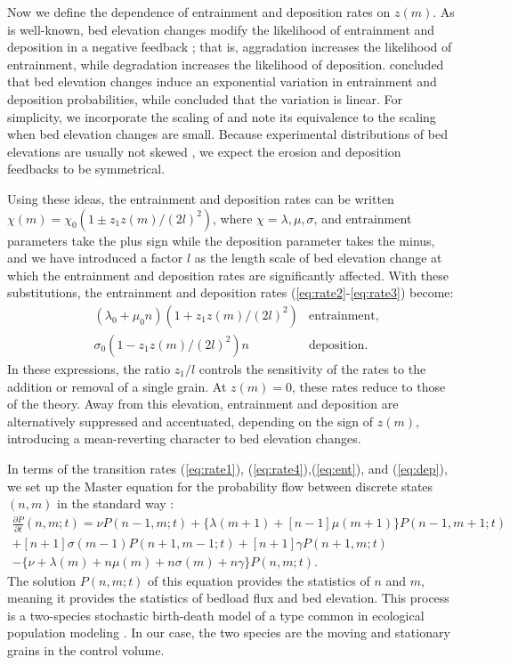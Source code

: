 \documentclass[draft]{agujournal2018}
\begin{document}
Now we define the dependence of entrainment and deposition rates on $z(m)$.
As is well-known, bed elevation changes modify the likelihood of entrainment and deposition in a negative feedback \citep{Sawai1987, Wong2007}; that is, aggradation increases the likelihood of entrainment, while degradation increases the likelihood of deposition.
\citet{Wong2007} concluded that bed elevation changes induce an exponential variation in entrainment and deposition probabilities, while \citet{Sawai1987} concluded that the variation is linear.
For simplicity, we incorporate the scaling of \citet{Sawai1987} and note its equivalence to the \citet{Wong2007} scaling when bed elevation changes are small.
Because experimental distributions of bed elevations are usually not skewed \citep{Wong2007, Singh2009, Martin2014}, we expect the erosion and deposition feedbacks to be symmetrical.

Using these ideas, the entrainment and deposition rates can be written $\chi(m) = \chi_0(1\pm z_1 z(m)/(2l)^2)$, where $\chi = \lambda, \mu, \sigma$, and entrainment parameters take the plus sign while the deposition parameter takes the minus, and we have introduced a factor $l$ as the length scale of bed elevation change at which the entrainment and deposition rates are significantly affected. 
With these substitutions, the entrainment and deposition rates (\ref{eq:rate2}-\ref{eq:rate3}) become:
\begin{align}
&(\lambda_0 + \mu_0 n)(1 + z_1z(m)/(2l)^2) & \text{entrainment}, \label{eq:ent}\\
&\sigma_0 (1-z_1z(m)/(2l)^2)n & \text{deposition}. \label{eq:dep}
\end{align}
In these expressions, the ratio $z_1/l$ controls the sensitivity of the rates to the addition or removal of a single grain.
At $z(m)=0$, these rates reduce to those of the \citet{Ancey2008} theory.
Away from this elevation, entrainment and deposition are alternatively suppressed and accentuated, depending on the sign of $z(m)$, introducing a mean-reverting character to bed elevation changes.

In terms of the transition rates (\ref{eq:rate1}), (\ref{eq:rate4}),(\ref{eq:ent}), and (\ref{eq:dep}), we set up the Master equation for the probability flow between discrete states $(n,m)$ in the standard way \citep[e.g.][]{Cox1965, Gillespie1992, Ancey2008}:
\begin{multline}
 \frac{\partial P}{\partial t}(n,m;t) =  
\nu P(n-1,m;t) + 
\{\lambda(m+1) + [n-1]\mu(m+1)\}P(n-1,m+1;t)\\ + 
[n+1]\sigma(m-1)P(n+1,m-1;t) + 
[n+1]\gamma P(n+1,m;t) \\- 
\{ \nu + \lambda(m) + n\mu(m) + n\sigma(m) + n \gamma \}P(n,m;t).
 \label{eq:master}
\end{multline} 
The solution $P(n,m;t)$ of this equation provides the statistics of $n$ and $m$, meaning it provides the statistics of bedload flux and bed elevation.
This process is a two-species stochastic birth-death model \citep[e.g.][]{Cox1965} of a type common in ecological population modeling \citep[e.g.][]{Pielou1977, Swift2002}.
In our case, the two species are the moving and stationary grains in the control volume.
\end{document}
